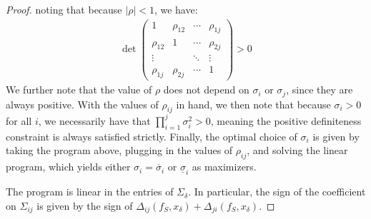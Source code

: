 \documentclass[11pt,dvipsnames]{article}
\begin{document}
\begin{appendix}
\begin{proof}
noting that because $|\rho|<1$, we have:
\begin{align*}
\det\begin{pmatrix}
1 & \rho_{12} & \cdots & \rho_{1j}\\
\rho_{12} & 1 & \cdots & \rho_{2j}\\
\vdots & & \ddots & \vdots\\
\rho_{1j} & \rho_{2j} & \cdots & 1
\end{pmatrix} > 0
\end{align*}
We further note that the value of $\rho$ does not depend on $\sigma_i$ or $\sigma_j$, since they are always positive.
With the values of $\rho_{ij}$ in hand, we then note that because $\sigma_{i}>0$ for all $i$, we necessarily have that $\prod_{i=1}^j \sigma_i^2>0$, meaning the positive definiteness constraint is always satisfied strictly.
Finally, the optimal choice of $\sigma_{i}$ is given by taking the program above, plugging in the values of $\rho_{ij}$, and solving the linear program, which yields either $\sigma_i = \overline{\sigma}_i$ or $\underline{\sigma}_i$ as maximizers.

The program is linear in the entries of $\Sigma_\delta$. In particular, the sign of the coefficient on $\Sigma_{ij}$ is given by the sign of $\Delta_{ij}(f_S,x_\delta)+\Delta_{ji}(f_S,x_\delta)$.
\end{proof}


\end{appendix}
\end{document}
